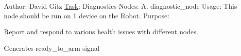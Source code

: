 Author\+: David Gitz \hyperlink{structTask}{Task}\+: Diagnostics Nodes\+: A. diagnostic\+\_\+node Usage\+: This node should be run on 1 device on the Robot. Purpose\+:
\begin{DoxyEnumerate}
\item Report and respond to various health issues with different nodes.
\item Generates ready\+\_\+to\+\_\+arm signal 
\end{DoxyEnumerate}